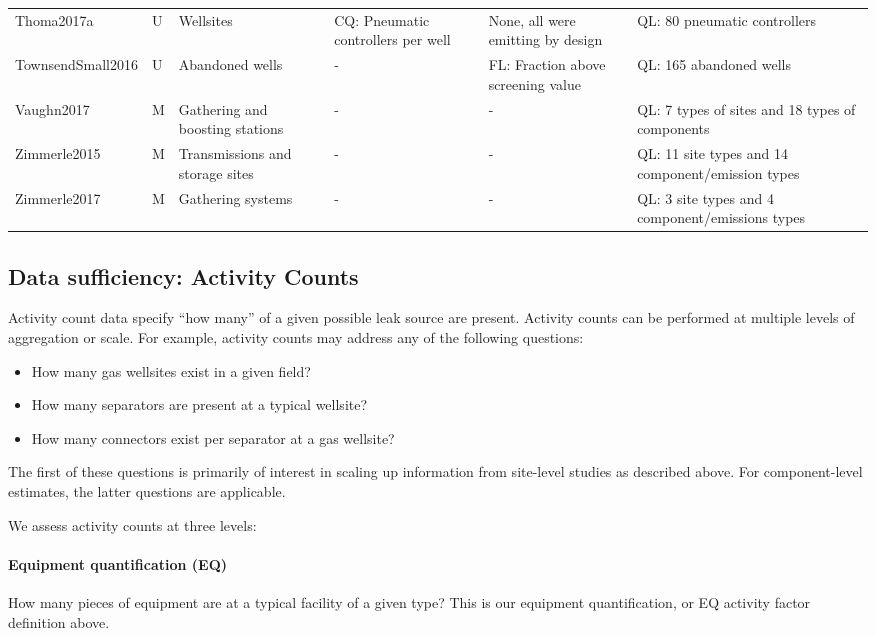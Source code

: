 \documentclass[11pt]{report}
\begin{document}
{{{{\begin{landscape}
\begin{table}[]
\begin{scriptsize}
\begin{tabular*}{1\columnwidth}{p{}p{}p{}p{}p{}p{}}
Thoma2017a  		& U         			& Wellsites    			& CQ: Pneumatic controllers per well   	& None, all were emitting by design         					& QL: 80 pneumatic controllers\\
TownsendSmall2016 & U         			& Abandoned wells        	& -      							& FL: Fraction above screening value        				& QL: 165 abandoned wells     \\
Vaughn2017 	 	& M         			& Gathering and boosting stations  & -      						& - 												& QL: 7 types of sites and 18 types of components \\
Zimmerle2015		& M         			& Transmissions and storage sites     & -      					& - 												& QL: 11 site types and 14 component/emission types         \\
Zimmerle2017		& M         			& Gathering systems      	& -      							& - 												& QL: 3 site types and 4 component/emissions types         \\
\bottomrule
\end{tabular*}
\end{scriptsize}
\end{table}
\end{landscape}


\subsection{Data sufficiency: Activity Counts}

Activity count data specify ``how many'' of a given possible leak source are present. Activity counts can be performed at multiple levels of aggregation or scale. For example, activity counts may address any of the following questions: 
\begin{itemize}
\item How many gas wellsites exist in a given field?
\item How many separators are present at a typical wellsite?
\item How many connectors exist per separator at a gas wellsite?
\end{itemize}

The first of these questions is primarily of interest in scaling up information from site-level studies as described above. For component-level estimates, the latter questions are applicable. 

We assess activity counts at three levels:
\paragraph{Equipment quantification (EQ)} How many pieces of equipment are at a typical facility of a given type? This is our equipment quantification, or EQ activity factor definition above.

}}}}
\end{document}
